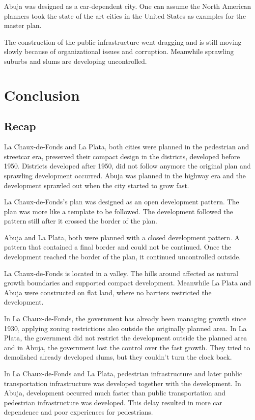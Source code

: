 \documentclass{article}
\begin{document}
\begin{multicols}{2}
			Abuja was designed as a car-dependent city. One can assume the North American planners took the state of the art cities in the United States as examples for the master plan.
			
			The construction of the public infrastructure went dragging and is still moving slowly because of organizational issues and corruption. Meanwhile sprawling suburbs and slums are developing uncontrolled.
			

	\clearpage
	\section{Conclusion}	
		\subsection{Recap}
	
		La Chaux-de-Fonds and La Plata, both cities were planned in the pedestrian and streetcar era, preserved their compact design in the districts, developed before 1950. Districts developed after 1950, did not follow anymore the original plan and sprawling development occurred.
		Abuja was planned in the highway era and the development sprawled out when the city started to grow fast.
	
		La Chaux-de-Fonds's plan was designed as an open development pattern. The plan was more like a template to be followed. The development followed the pattern still after it crossed the border of the plan.
	
		Abuja and La Plata, both were planned with a closed development pattern. A pattern that contained a final border and could not be continued. Once the development reached the border of the plan, it continued uncontrolled outside.
	
		La Chaux-de-Fonds is located in a valley. The hills around affected as natural growth boundaries and supported compact development. Meanwhile La Plata and Abuja were constructed on flat land, where no barriers restricted the development.
	
		In La Chaux-de-Fonds, the government has already been managing growth since 1930, applying zoning restrictions also outside the originally planned area. In La Plata, the government did not restrict the development outside the planned area and in Abuja, the government lost the control over the fast growth. They tried to demolished already developed slums, but they couldn't turn the clock back.

		In La Chaux-de-Fonds and La Plata, pedestrian infrastructure and later public transportation infrastructure was developed together with the development. In Abuja, development occurred much faster than public transportation and pedestrian infrastructure was developed. This delay resulted in more car dependence and poor experiences for pedestrians.



\end{multicols}
\end{document}

